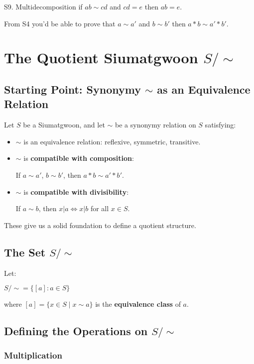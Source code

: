S9. Multidecomposition if $ab \sim cd$ and $cd = e$ then $ab =e$. 

From S4 you'd be able to prove that $a \sim a'$ and $b\sim b'$ then $a * b \sim a' * b'$.

\section{The Quotient Siumatgwoon $S/\sim$}

\subsection{Starting Point: Synonymy $\sim$ as an Equivalence Relation}

Let $S$ be a Siumatgwoon, and let $\sim$ be a synonymy relation on $S$ satisfying:

\begin{itemize}
\item $\sim$ is an equivalence relation: reflexive, symmetric, transitive.
\item $\sim$ is \textbf{compatible with composition}:
    
    If $a\sim a'$, $b\sim b'$, then $a*b\sim a'*b'$.
    
\item $\sim$ is \textbf{compatible with divisibility}:
    
    If $a\sim b$, then $x|a \iff x|b$ for all $x\in S$.
\end{itemize}

These give us a solid foundation to define a quotient structure.

\subsection{The Set $S/\sim$}

Let:

$S/\sim=\{[a]:a\in S\}$

where $[a]=\{x\in S\mid x\sim a\}$ is the \textbf{equivalence class} of $a$.

\subsection{Defining the Operations on $S/\sim$}

\subsubsection{Multiplication}

